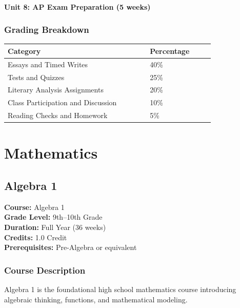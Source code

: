 \documentclass[12pt,oneside]{book}
\begin{document}
\subsection*{Unit 8: AP Exam Preparation (5 weeks)}

\section{Grading Breakdown}
\begin{center}
\begin{tabular}{L{0.55\linewidth}L{0.25\linewidth}}
\toprule
\textbf{Category} & \textbf{Percentage} \\
\midrule
Essays and Timed Writes & 40\% \\
Tests and Quizzes & 25\% \\
Literary Analysis Assignments & 20\% \\
Class Participation and Discussion & 10\% \\
Reading Checks and Homework & 5\% \\
\bottomrule
\end{tabular}
\end{center}

\part{Mathematics}

\chapter{Algebra 1}

\noindent\textbf{Course:} Algebra 1\\
\textbf{Grade Level:} 9th--10th Grade\\
\textbf{Duration:} Full Year (36 weeks)\\
\textbf{Credits:} 1.0 Credit\\
\textbf{Prerequisites:} Pre-Algebra or equivalent

\section{Course Description}
Algebra 1 is the foundational high school mathematics course introducing algebraic thinking, functions,
and mathematical modeling.
\end{document}
